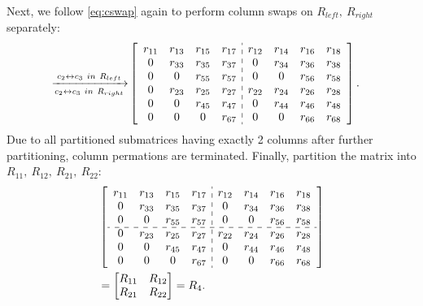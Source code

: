 \documentclass[conference]{IEEEtran}
\numberwithin{equation}{section}
\begin{document}
Next, we follow  \eqref{eq:cswap} again to perform column swaps
on $R_{left}, \ R_{right}$ separately:
\begin{align*}
\xrightarrow[c_{2} \leftrightarrow c_{3}\ in\ R_{right}]{c_{2} \leftrightarrow c_{3}\ in\ R_{left}}
&\begin{bmatrix}
\begin{array}{cccc:cccc}
 r_{11} & r_{13} & r_{15} & r_{17} & r_{12} & r_{14} & r_{16} & r_{18}\\
 0      & r_{33} & r_{35} & r_{37} & 0      & r_{34} & r_{36} & r_{38}\\
 0      & 0      & r_{55} & r_{57} & 0      & 0      & r_{56} & r_{58}\\
 0      & r_{23} & r_{25} & r_{27} & r_{22} & r_{24} & r_{26} & r_{28}\\
 0      & 0      & r_{45} & r_{47} & 0      & r_{44} & r_{46} & r_{48}\\
 0      & 0      & 0      & r_{67} & 0      & 0      & r_{66} & r_{68}\\
\end{array}
\end{bmatrix}.
\end{align*}
Due to all partitioned submatrices having exactly 2 columns after further partitioning, column permations are terminated. Finally, partition the matrix into \(R_{11}, \ R_{12}, \ R_{21}, \ R_{22}\):
\begin{align*}
&\begin{bmatrix}
\begin{array}{cccc:cccc}
 r_{11} & r_{13} & r_{15} & r_{17} & r_{12} & r_{14} & r_{16} & r_{18}\\
 0      & r_{33} & r_{35} & r_{37} & 0      & r_{34} & r_{36} & r_{38}\\
 0      & 0      & r_{55} & r_{57} & 0      & 0      & r_{56} & r_{58}\\
 \cdashline{1-8}
 0      & r_{23} & r_{25} & r_{27} & r_{22} & r_{24} & r_{26} & r_{28}\\
 0      & 0      & r_{45} & r_{47} & 0      & r_{44} & r_{46} & r_{48}\\
 0      & 0      & 0      & r_{67} & 0      & 0      & r_{66} & r_{68}\\
\end{array}
\end{bmatrix} \\
&=\begin{bmatrix}
    R_{11} & R_{12}\\R_{21} & R_{22}
\end{bmatrix} = R_4.
\end{align*}
\end{document}
